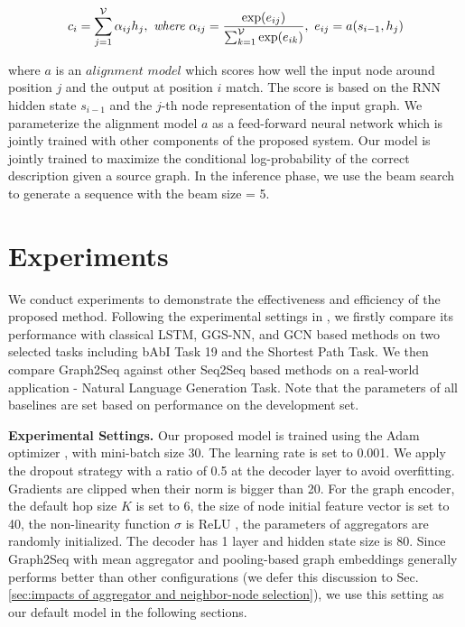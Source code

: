 \documentclass{article} \usepackage{iclr2019_conference,times}
\begin{document}
\begin{equation}
c_{i} = \sum_{j=1}^{\mathcal{V}}\alpha_{ij}h_{j}, \\\ \textit{where} \\\ \alpha_{ij} = \frac{\exp(e_{ij})}{ \sum_{k=1}^{\mathcal{V}}\exp(e_{ik})}, \\\ \\\ e_{ij} = a(s_{i-1}, h_{j})    
\end{equation}

where $a$ is an $alignment$ $model$ which scores how well the input node around position $j$ and the output at position $i$ match.
The score is based on the RNN hidden state $s_{i-1}$ and the $j$-th node representation of the input graph.
We parameterize the alignment model $a$ as a feed-forward neural network which is jointly trained with other components
of the proposed system.
Our model is jointly trained to maximize the conditional log-probability of the correct description given a source graph.
In the inference phase, we use the beam search to generate a sequence with the beam size = 5.




\section{Experiments}
We conduct experiments to demonstrate the effectiveness and efficiency of the proposed method. Following the experimental settings in  \citep{li2015gated}, we firstly compare its performance with classical LSTM, GGS-NN, and GCN based methods on two selected tasks including bAbI Task 19 and the Shortest Path Task. We then compare Graph2Seq against other Seq2Seq based methods on a real-world application - Natural Language Generation Task. 
Note that the parameters of all baselines are set based on performance on the development set.


\textbf{Experimental Settings.}
Our proposed model is trained using the Adam optimizer \citep{DBLP:journals/corr/KingmaB14},
with mini-batch size 30. The learning rate is set to 0.001.
We apply the dropout strategy \citep{DBLP:journals/jmlr/SrivastavaHKSS14} with a ratio of 0.5 at the decoder layer to avoid overfitting.
Gradients are clipped when their norm is bigger than 20.
For the graph encoder,
the default hop size $K$ is set to 6, 
the size of node initial feature vector is set to 40,
the non-linearity function $\sigma$ is ReLU \citep{DBLP:journals/jmlr/GlorotBB11},
the parameters of aggregators are randomly initialized.
The decoder has 1 layer and hidden state size is 80. 
Since Graph2Seq with mean aggregator and pooling-based graph embeddings generally performs better than other configurations (we defer this discussion to Sec. \ref{sec:impacts of aggregator and neighbor-node selection}), we use this setting as our default model in the following sections.  
\end{document}
